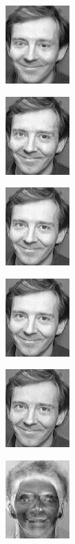 \documentclass[a4paper]{article}
\begin{document}
\includegraphics[scale=0.500000]{PartialReconstruction6.jpg}

\includegraphics[scale=0.500000]{PartialReconstruction7.jpg}

\includegraphics[scale=0.500000]{PartialReconstruction8.jpg}

\includegraphics[scale=0.500000]{PartialReconstruction9.jpg}

\includegraphics[scale=0.500000]{PartialReconstruction10.jpg}

\includegraphics[scale=0.500000]{NewPrincComp0.jpg}
\end{document}
